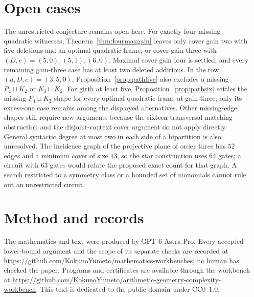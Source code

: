 \documentclass[11pt]{article}
\newcommand{\workbenchurl}{https://github.com/KokunoYumeto/arithmetic-geometry-complexity-workbench}
\newcommand{\recordurl}{https://github.com/KokunoYumeto/mathematics-workbenches}
\theoremstyle{definition}
\begin{document}
\section{Open cases}
The unrestricted conjecture remains open here. For exactly four missing quadratic witnesses, Theorem~\ref{thm:fourmaxgain} leaves only cover gain two with five deletions and an optimal quadratic frame, or cover gain three with $(D,e)=(5,0),(5,1),(6,0)$. Maximal cover gain four is settled, and every remaining gain-three case has at least two deleted additions. In the row $(d,D,e)=(3,5,0)$, Proposition~\ref{prop:pathfive} also excludes a missing $P_4\sqcup K_2$ or $K_3\sqcup K_2$. For girth at least five, Proposition~\ref{prop:pathsix} settles the missing $P_4\sqcup K_2$ shape for every optimal quadratic frame at gain three; only its excess-one case remains among the displayed alternatives. Other missing-edge shapes still require new arguments because the sixteen-transversal matching obstruction and the disjoint-context cover argument do not apply directly. General syntactic degree at most two in each side of a bipartition is also unresolved. The incidence graph of the projective plane of order three has $52$ edges and a minimum cover of size $13$, so the star construction uses $64$ gates; a circuit with $63$ gates would refute the proposed exact count for that graph. A search restricted to a symmetry class or a bounded set of monomials cannot rule out an unrestricted circuit.

\section*{Method and records}
The mathematics and text were produced by GPT-6 Astra Pro. Every accepted lower-bound argument and the scope of its separate checks are recorded at \url{\recordurl}; no human has checked the paper. Programs and certificates are available through the workbench at \url{\workbenchurl}. This text is dedicated to the public domain under CC0~1.0.
\end{document}
